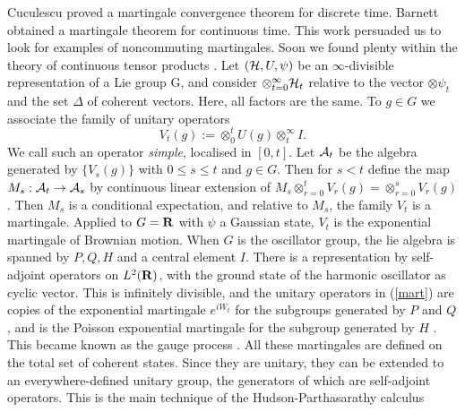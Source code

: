 Cuculescu \cite{Cuculescu} proved a martingale convergence theorem for
discrete time. Barnett \cite{Barnett} obtained a martingale theorem for
continuous time. This work persuaded us to look for examples of noncommuting
martingales. Soon we found plenty within the theory of continuous
tensor products \cite{Hudson}. Let $({\cal H},U,\psi)$ be an
$\infty$-divisible representation of a Lie group G, and consider
$\otimes_{t=0}^\infty {\cal H}_t$ relative to the vector $\otimes\psi_t$
and the set $\Delta$ of coherent vectors. Here, all factors are the same.
To $g\in G$ we associate the family of unitary operators
\begin{equation}
V_t(g):=\otimes_0^t U(g)\otimes_t^\infty I.
\label{mart}
\end{equation}
We call such an operator {\em simple}, localised in $[0,t]$.
Let ${\cal A}_t$ be the algebra generated by $\{V_s(g)\}$ with
$0\leq s\leq t$ and $g\in G$. Then for $s<t$ define the map $M_s:{\cal A}_t
\rightarrow{\cal A}_s$ by continuous linear extension of $M_s\otimes_{r=0}
^tV_r(g)=\otimes_{r=0}^sV_r(g)$. Then $M_s$ is a conditional expectation,
and relative to $M_s$, the family $V_t$ is a martingale.
Applied to $G={\bf R}$ with $\psi$ a Gaussian state, $V_t$ is the
exponential martingale of Brownian motion.
When $G$ is the oscillator group, the lie algebra is spanned by $P,Q,H$ and
a central element $I$. There is a representation by self-adjoint operators
on $L^2({\bf R})$, with the ground state of the harmonic oscillator as cyclic
vector. This is
infinitely divisible, and the unitary operators in (\ref{mart})
are copies of the exponential martingale $e^{iW_t}$ for the subgroups
generated by $P$ and $Q$, and is the Poisson exponential martingale
for the subgroup generated by $H$ \cite{Wulfsohn}. This became known as the
gauge process \cite{Partha2}.
All these martingales are defined on the total set of coherent states.
Since they are unitary, they can be extended to an everywhere-defined
unitary group, the generators of which are self-adjoint operators.
This is
the main technique of the Hudson-Parthasarathy calculus
\cite{Hudson4,Hudson3,Partha2}

